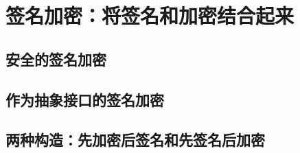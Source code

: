 \section{签名加密：将签名和加密结合起来}\label{sec:13-7}

\begin{definition}\label{def:13-5}
	
\end{definition}

\subsection{安全的签名加密}\label{subsec:13-7-1}

\begin{game}[密文完整性]\label{game:13-5}
	
\end{game}

\begin{definition}\label{def:13-6}
	
\end{definition}

\begin{game}\label{game:13-6}
	
\end{game}

\begin{definition}\label{def:13-7}
	
\end{definition}

\begin{definition}\label{def:13-8}
	
\end{definition}

\subsection{作为抽象接口的签名加密}\label{subsec:13-7-2}

\subsection{两种构造：先加密后签名和先签名后加密}\label{subsec:13-7-3}

\begin{theorem}\label{theo:13-8}
	
\end{theorem}

\begin{theorem}\label{theo:13-9}
	
\end{theorem}

